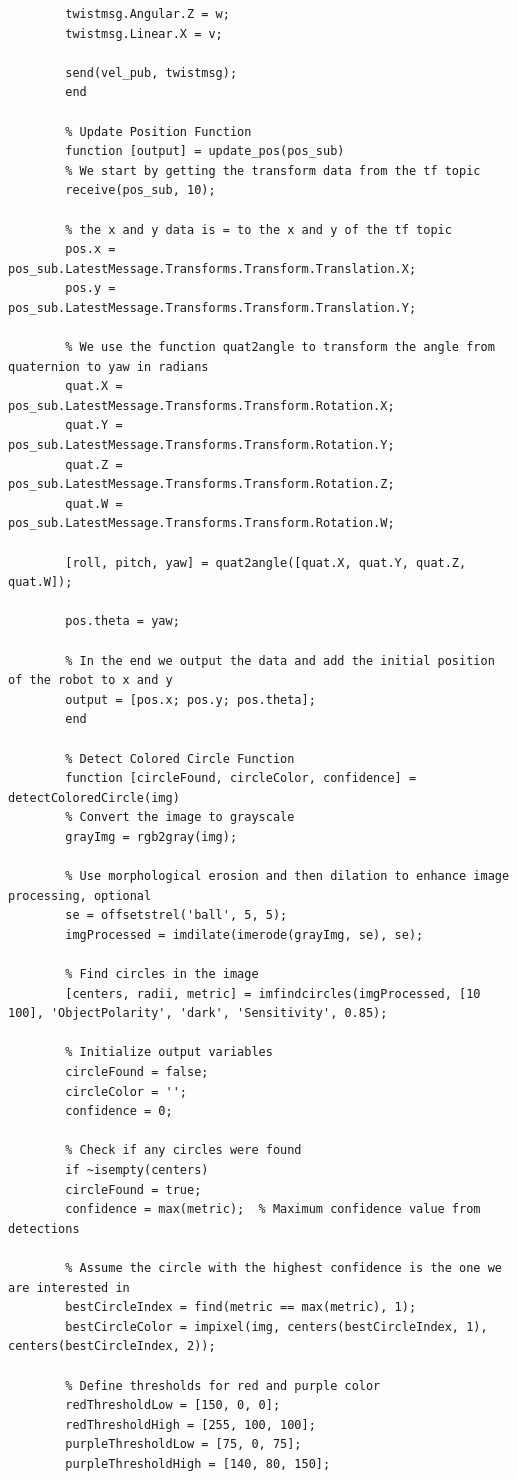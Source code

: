 \documentclass{article}
\begin{document}
\begin{verbatim}
		twistmsg.Angular.Z = w;
		twistmsg.Linear.X = v;
		
		send(vel_pub, twistmsg);
		end
		
		% Update Position Function
		function [output] = update_pos(pos_sub)
		% We start by getting the transform data from the tf topic
		receive(pos_sub, 10);
		
		% the x and y data is = to the x and y of the tf topic
		pos.x = pos_sub.LatestMessage.Transforms.Transform.Translation.X;
		pos.y = pos_sub.LatestMessage.Transforms.Transform.Translation.Y;
		
		% We use the function quat2angle to transform the angle from quaternion to yaw in radians
		quat.X = pos_sub.LatestMessage.Transforms.Transform.Rotation.X;
		quat.Y = pos_sub.LatestMessage.Transforms.Transform.Rotation.Y;
		quat.Z = pos_sub.LatestMessage.Transforms.Transform.Rotation.Z;
		quat.W = pos_sub.LatestMessage.Transforms.Transform.Rotation.W;
		
		[roll, pitch, yaw] = quat2angle([quat.X, quat.Y, quat.Z, quat.W]);
		
		pos.theta = yaw;
		
		% In the end we output the data and add the initial position of the robot to x and y
		output = [pos.x; pos.y; pos.theta];
		end
		
		% Detect Colored Circle Function
		function [circleFound, circleColor, confidence] = detectColoredCircle(img)
		% Convert the image to grayscale
		grayImg = rgb2gray(img);
		
		% Use morphological erosion and then dilation to enhance image processing, optional
		se = offsetstrel('ball', 5, 5);
		imgProcessed = imdilate(imerode(grayImg, se), se);
		
		% Find circles in the image
		[centers, radii, metric] = imfindcircles(imgProcessed, [10 100], 'ObjectPolarity', 'dark', 'Sensitivity', 0.85);
		
		% Initialize output variables
		circleFound = false;
		circleColor = '';
		confidence = 0;
		
		% Check if any circles were found
		if ~isempty(centers)
		circleFound = true;
		confidence = max(metric);  % Maximum confidence value from detections
		
		% Assume the circle with the highest confidence is the one we are interested in
		bestCircleIndex = find(metric == max(metric), 1);
		bestCircleColor = impixel(img, centers(bestCircleIndex, 1), centers(bestCircleIndex, 2));
		
		% Define thresholds for red and purple color
		redThresholdLow = [150, 0, 0];
		redThresholdHigh = [255, 100, 100];
		purpleThresholdLow = [75, 0, 75];
		purpleThresholdHigh = [140, 80, 150];
		

\end{verbatim}
\end{document}
